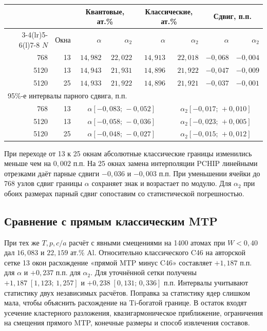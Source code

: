 \documentclass[11pt,a4paper]{article}
\begin{document}
\begin{center}\small
\begin{tabular}{@{}rr rr rr rr@{}}
\toprule
 && \multicolumn{2}{c}{Квантовые, ат.\%}
 & \multicolumn{2}{c}{Классические, ат.\%}
 & \multicolumn{2}{c}{Сдвиг, п.п.}\\
\cmidrule(lr){3-4}\cmidrule(lr){5-6}\cmidrule(l){7-8}
\(N\) & Окна & \(\alpha\) & \(\alpha_2\) & \(\alpha\) & \(\alpha_2\) & \(\alpha\) & \(\alpha_2\)\\
\midrule
768 & 13 & $14{,}982$ & $22{,}022$ & $14{,}913$ & $22{,}018$ & $-0{,}068$ & $-0{,}004$\\
5120 & 13 & $14{,}943$ & $21{,}931$ & $14{,}896$ & $21{,}922$ & $-0{,}047$ & $-0{,}009$\\
5120 & 25 & $14{,}933$ & $21{,}922$ & $14{,}896$ & $21{,}921$ & $-0{,}037$ & $-0{,}001$\\
\midrule
\multicolumn{8}{l}{95\%-е интервалы парного сдвига, п.п.}\\
768 & 13 & \multicolumn{3}{c}{\(\alpha\)\enspace $[-0{,}083;\,-0{,}052]$} & \multicolumn{3}{c}{\(\alpha_2\)\enspace $[-0{,}017;\,+0{,}010]$}\\
5120 & 13 & \multicolumn{3}{c}{\(\alpha\)\enspace $[-0{,}058;\,-0{,}036]$} & \multicolumn{3}{c}{\(\alpha_2\)\enspace $[-0{,}023;\,+0{,}005]$}\\
5120 & 25 & \multicolumn{3}{c}{\(\alpha\)\enspace $[-0{,}048;\,-0{,}027]$} & \multicolumn{3}{c}{\(\alpha_2\)\enspace $[-0{,}015;\,+0{,}012]$}\\
\bottomrule
\end{tabular}\end{center}


При переходе от 13 к 25 окнам абсолютные классические границы изменились
меньше чем на \(0{,}002\) п.п. На 25 окнах замена интерполяции PCHIP
линейными отрезками даёт парные сдвиги \(-0{,}036\) и \(-0{,}003\) п.п.
При уменьшении ячейки до 768 узлов сдвиг границы \(\alpha\) сохраняет
знак и возрастает по модулю. Для \(\alpha_2\) при обоих размерах
парный сдвиг сопоставим со статистической погрешностью.

\subsection*{Сравнение с прямым классическим MTP}
При тех же \(T,p,c/a\) расчёт с явными смещениями на 1400 атомах при
\(W<0{,}40\) дал \(16{,}083\) и \(22{,}159\) ат.\% Al. Относительно
классического C46 на авторской сетке 13 окон расхождение
«прямой MTP минус C46» составляет \(+1{,}187\) п.п. для \(\alpha\)
и \(+0{,}237\) п.п. для \(\alpha_2\). Для уточнённой сетки получены
\(+1{,}187\;[1{,}123;\,1{,}257]\) и \(+0{,}238\;[0{,}131;\,0{,}336]\)
п.п. Интервалы учитывают статистику двух независимых расчётов.
Поправка за статистику ядер слишком мала, чтобы объяснить расхождение
на Ti-богатой границе. В остаток входят усечение кластерного разложения,
квазигармоническое приближение, ограничения на смещения прямого MTP,
конечные размеры и способ извлечения составов.
\clearpage
\end{document}
